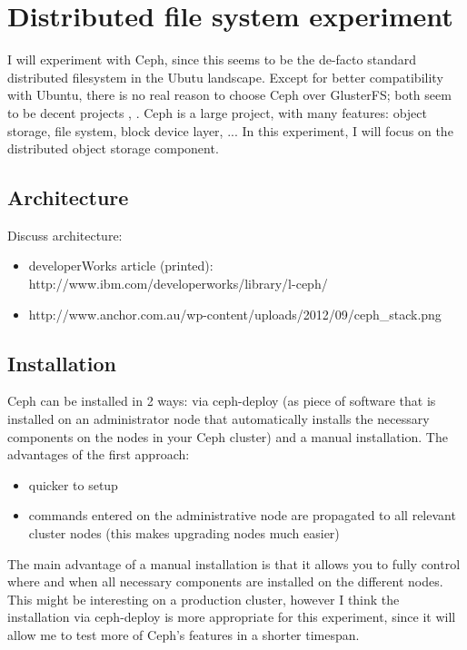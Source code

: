 \documentclass[12pt]{report}
\begin{document}
\section{Distributed file system experiment}
I will experiment with Ceph, since this seems to be the de-facto
standard distributed filesystem in the Ubutu landscape.
Except for better compatibility with Ubuntu, there is no real reason
to choose Ceph over GlusterFS; both seem to be decent projects
\cite{ceph_vs_gluster_1}, \cite{ceph_vs_gluster_debate}.
Ceph is a large project, with many features: object storage, file
system, block device layer, ... In this experiment, I will focus on
the distributed object storage component.

\subsection{Architecture}
\label{subsec:ceph_architecture}
Discuss architecture: 
\begin{itemize}
\item developerWorks article (printed):
  http://www.ibm.com/developerworks/library/l-ceph/
\item http://www.anchor.com.au/wp-content/uploads/2012/09/ceph\_stack.png
\end{itemize}

\subsection{Installation}
Ceph can be installed in 2 ways: via ceph-deploy (as piece of software
that is installed on an administrator node that automatically installs the
necessary components on the nodes in your Ceph cluster) and a
manual installation.
The advantages of the first approach:
\begin{itemize}
\item quicker to setup
\item commands entered on the administrative node are 
  propagated to all relevant cluster nodes (this makes upgrading nodes
  much easier)
\end{itemize}
The main advantage of a manual installation is that it allows you to
fully control where and when all necessary components are installed on the different
nodes. 
This might be interesting on a production cluster, however I think the
installation via ceph-deploy is more appropriate for this experiment, since it will
allow me to test more of Ceph's features in a shorter timespan.
\end{document}
